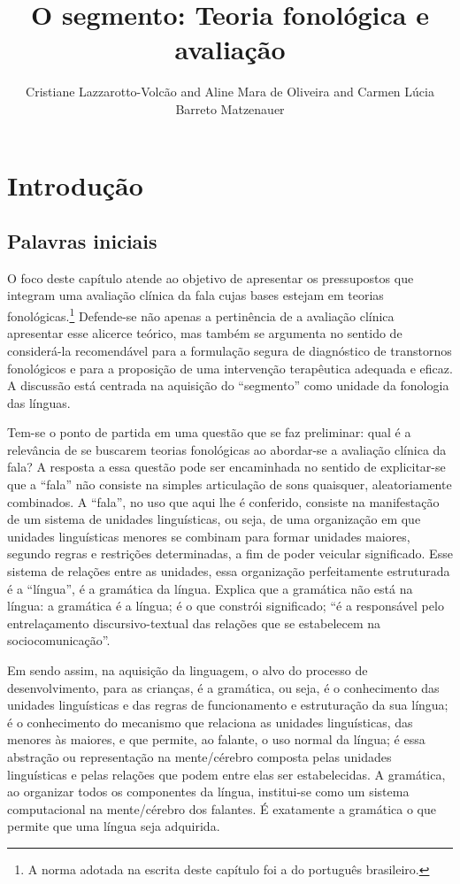 \documentclass[output=paper,colorlinks,citecolor=brown,booklanguage=portuguese]{langscibook}
\title{O segmento: Teoria fonológica e avaliação}
\author{Cristiane Lazzarotto-Volcão\affiliation{Universidade Federal de Santa Catarina (UFSC)} and Aline Mara de Oliveira\affiliation{Universidade Federal de Santa Catarina (UFSC)} and Carmen Lúcia Barreto Matzenauer\affiliation{Universidade Federal de Pelotas}}
\begin{document}
\maketitle
{}

\section{Introdução}
\subsection{Palavras iniciais}
O foco deste capítulo atende ao objetivo de apresentar os pressupostos que integram uma avaliação clínica da fala cujas bases estejam em teorias fonológicas.\footnote{A norma adotada na escrita deste capítulo foi a do português brasileiro.}
Defende-se não apenas a pertinência de a avaliação clínica apresentar esse alicerce teórico, mas também se argumenta no sentido de considerá-la recomendável para a formulação segura de diagnóstico de trans\-tornos fonológicos e para a proposição de uma intervenção terapêutica adequada e eficaz. A discussão está centrada na aquisição do “segmento” como unidade da fonologia das línguas.

Tem-se o ponto de partida em uma questão que se faz preliminar: qual é a relevância de se buscarem teorias fonológicas ao abordar-se a avaliação clínica da fala? A resposta a essa questão pode ser encaminhada no sentido de explicitar-se que a “fala” não consiste na simples articulação de sons quaisquer, aleatoriamente combinados. A “fala”, no uso que aqui lhe é conferido, consiste na manifestação de um sistema de unidades linguísticas, ou seja, de uma organização em que unidades linguísticas menores se combinam para formar unidades maiores, segundo regras e restrições determinadas, a fim de poder veicular significado. Esse sistema de relações entre as unidades, essa organização perfeitamente estruturada é a “língua”, é a gramática da língua. Explica \citet[9]{MouraNeves2010} que a gramática não está na língua: a gramática é a língua; é o que constrói significado; “é a responsável pelo entrelaçamento discursivo-textual das relações que se estabelecem na sociocomunicação”.

Em sendo assim, na aquisição da linguagem, o alvo do processo de desenvolvimento, para as crianças, é a gramática, ou seja, é o conhecimento das unidades linguísticas e das regras de funcionamento e estruturação da sua língua; é o conhecimento do mecanismo que relaciona as unidades linguísticas, das menores às maiores, e que permite, ao falante, o uso normal da língua; é essa abstração ou representação na mente/cérebro composta pelas unidades linguísticas e pelas relações que podem entre elas ser estabelecidas. A gramática, ao organizar todos os componentes da língua, institui-se como um sistema computacional na mente/cérebro dos falantes. É exatamente a gramática o que permite que uma língua seja adquirida.
\end{document}
